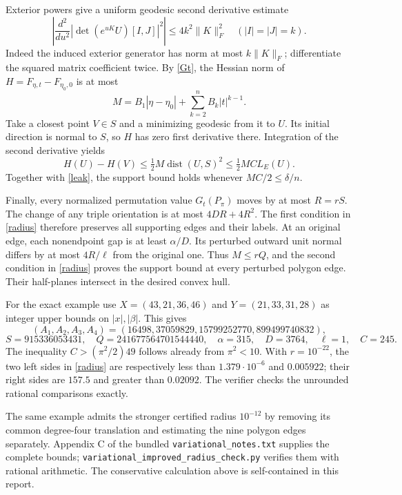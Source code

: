 Exterior powers give a uniform geodesic second derivative estimate
\[
\left|\frac{d^2}{du^2}|\det(e^{uK}U)[I,J]|^2\right|
\le4k^2\|K\|_F^2\quad(|I|=|J|=k).
\]
Indeed the induced exterior generator has norm at most $k\|K\|_F$; differentiate the squared matrix coefficient twice. By \eqref{Gt}, the Hessian norm of
$H=F_{\eta,t}-F_{\eta_0,0}$ is at most
\[
M=B_1|\eta-\eta_0|+\sum_{k=2}^nB_k|t|^{k-1}.
\]
Take a closest point $V\in S$ and a minimizing geodesic from it to $U$. Its initial direction is normal to $S$, so $H$ has zero first derivative there. Integration of the second derivative yields
\[
H(U)-H(V)\le\tfrac12 M\operatorname{dist}(U,S)^2\le\tfrac12 MC L_E(U).
\]
Together with \eqref{leak}, the support bound holds whenever $MC/2\le\delta/n$.

Finally, every normalized permutation value $G_t(P_\pi)$ moves by at most $R=rS$. The change of any triple orientation is at most $4DR+4R^2$. The first condition in \eqref{radius} therefore preserves all supporting edges and their labels. At an original edge, each nonendpoint gap is at least $\alpha/D$. Its perturbed outward unit normal differs by at most $4R/\ell$ from the original one. Thus $M\le rQ$, and the second condition in \eqref{radius} proves the support bound at every perturbed polygon edge. Their half-planes intersect in the desired convex hull.

For the exact example use $X=(43,21,36,46)$ and $Y=(21,33,31,28)$ as integer upper bounds on $|x|,|\beta|$. This gives
\[
(A_1,A_2,A_3,A_4)=(16498,37059829,15799252770,899499740832),
\]
\[
S=915336053431,\quad Q=241677564701544440,
\quad \alpha=315,\quad D=3764,\quad\ell=1,\quad C=245.
\]
The inequality $C>(\pi^2/2)49$ follows already from $\pi^2<10$. With $r=10^{-22}$, the two left sides in \eqref{radius} are respectively less than $1.379\cdot10^{-6}$ and $0.005922$; their right sides are $157.5$ and greater than $0.02092$. The verifier checks the unrounded rational comparisons exactly.

The same example admits the stronger certified radius $10^{-12}$ by removing its common degree-four translation and estimating the nine polygon edges separately. Appendix C of the bundled \nolinkurl{variational_notes.txt} supplies the complete bounds; \nolinkurl{variational_improved_radius_check.py} verifies them with rational arithmetic. The conservative calculation above is self-contained in this report.
